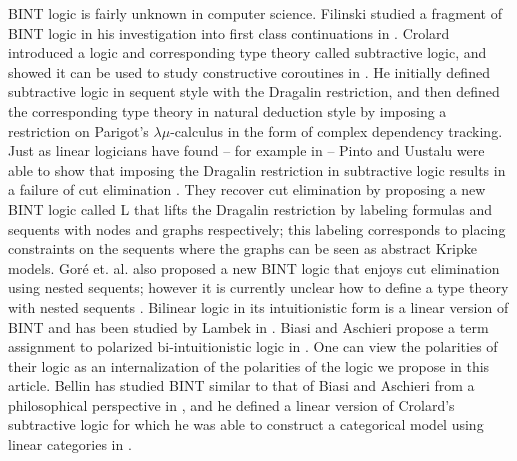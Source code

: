 BINT logic is fairly unknown in computer science.  Filinski studied a
fragment of BINT logic in his investigation into first class
continuations in \cite{Filinski:1989}.  Crolard
introduced a logic and corresponding type theory called subtractive
logic, and showed it can be used to study constructive coroutines in
\cite{crolard01,Crolard:2004}.  He initially defined subtractive logic
in sequent style with the Dragalin restriction, and then defined the
corresponding type theory in natural deduction style by imposing a
restriction on Parigot's $\lambda\mu$-calculus in the form of complex
dependency tracking.  Just as linear logicians have found -- for
example in \cite{Schellinx:1991} -- Pinto and Uustalu were able to
show that imposing the Dragalin restriction in subtractive logic
results in a failure of cut elimination \cite{Pinto:2009}.  They
recover cut elimination by proposing a new BINT logic called L that
lifts the Dragalin restriction by labeling formulas and sequents with
nodes and graphs respectively; this labeling corresponds to placing
constraints on the sequents where the graphs can be seen as abstract
Kripke models. Gor\'e et. al. also proposed a new BINT logic that
enjoys cut elimination using nested sequents; however it is currently
unclear how to define a type theory with nested sequents
\cite{DBLP:conf/aiml/GorePT08}.  Bilinear logic in its intuitionistic
form is a linear version of BINT and has been studied by Lambek in
\cite{Lambek:1993,Lambek:1995}.  Biasi and Aschieri propose a term
assignment to polarized bi-intuitionistic logic in
\cite{Biasi:2008:TAP:2365856.2365859}.  One can view the polarities of
their logic as an internalization of the polarities of the logic we
propose in this article. Bellin has studied BINT similar to that of
Biasi and Aschieri from a philosophical perspective in
\cite{Bellin:2004,Bellin:2005,Bellin:2014}, and he defined a linear
version of Crolard's subtractive logic for which he was able to
construct a categorical model using linear categories in
\cite{Bellin:2012}.

